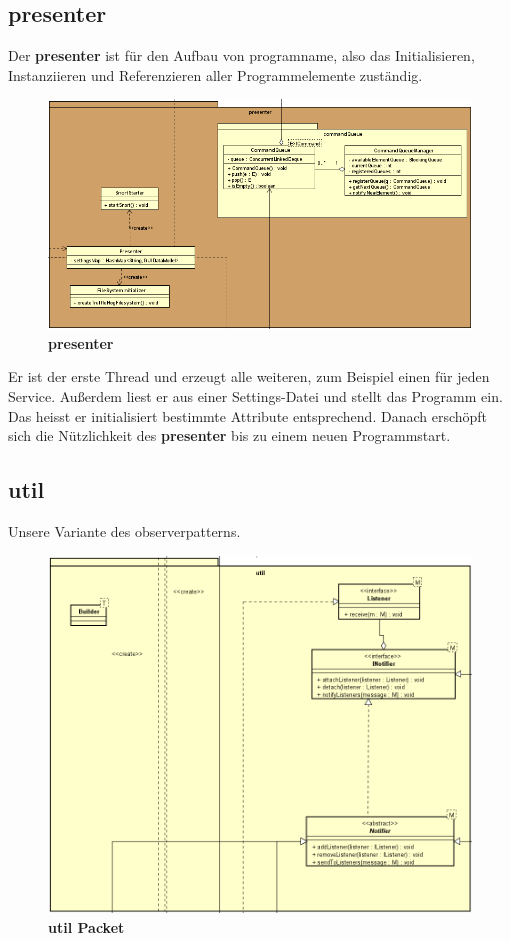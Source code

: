\subsection{\textbf{presenter}}


Der \textbf{presenter} ist für den Aufbau von \gls{programname}, also das
Initialisieren, Instanziieren und Referenzieren aller Programmelemente zuständig.

\begin{figure}[H]
  \centering
  \includegraphics[width=\textwidth]{../diagramimages/presenter.png}
  \caption{\textbf{presenter}}
\end{figure}

Er ist der erste Thread und erzeugt alle weiteren, zum Beispiel einen für jeden
Service. Außerdem liest er aus einer Settings-Datei und stellt das Programm ein.
Das heisst er initialisiert bestimmte Attribute entsprechend. Danach erschöpft
sich die Nützlichkeit des \textbf{presenter} bis zu einem neuen Programmstart.


\subsection{\textbf{util}}


Unsere Variante des \gls{observerpattern}s.

\begin{figure}[H]
  \centering
  \includegraphics[width=\textwidth]{../diagramimages/util.png}
  \caption{\textbf{util Packet}}
\end{figure}

